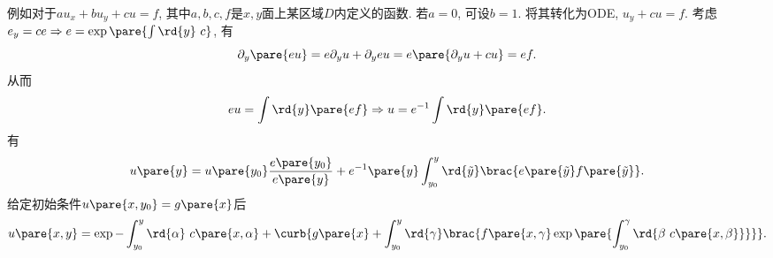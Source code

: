 \documentclass[hidelinks]{ctexart}
\begin{document}
\newpoint{}例如对于$au_x + bu_y + cu = f$, 其中$a,b,c,f$是$x,y$面上某区域$D$内定义的函数.
\newpoint{}若$a=0$, 可设$b=1$. 将其转化为ODE, $u_y + cu = f$.
考虑$e_y = ce \Rightarrow e = \exp \pare{\int \rd{y}\ c}$, 有
\[ \partial_y \pare{eu} = e\partial_y u + \partial_y eu = e\pare{\partial_y u + cu} = ef. \]
从而
\[ eu = \int \rd{y}\pare{ef} \Rightarrow u = e^{-1} \int \rd{y} \pare{ef}. \]
有
\[ u\pare{y} = u\pare{y_0} \frac{e\pare{y_0}}{e\pare{y}} + e^{-1}\pare{y} \int_{y_0}^y \rd{\tilde{y}} \brac{e\pare{\tilde{y}}f\pare{\tilde{y}}}. \]
\newpoint{}给定初始条件$u\pare{x,y_0}=g\pare{x}$后
\[ u\pare{x,y} = \exp{-\int_{y_0}^y \rd{\alpha}\ c\pare{x,\alpha}} + \curb{g\pare{x} + \int_{y_0}^y \rd{\gamma} \brac{f\pare{x,\gamma} \exp\pare{\int_{y_0}^\gamma \rd{\beta\ c\pare{x,\beta}}}} }. \]


\end{document}
